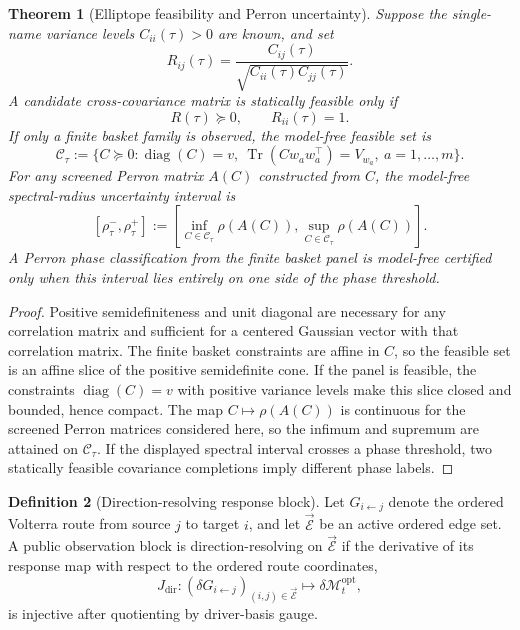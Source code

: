 \documentclass[11pt,a4paper]{amsart}
\theoremstyle{plain}
\newtheorem{theorem}{Theorem}[section]
\theoremstyle{definition}
\newtheorem{definition}[theorem]{Definition}
\theoremstyle{remark}
\newcommand{\cE}{\mathcal{E}}
\newcommand{\cM}{\mathcal{M}}
\begin{document}
\begin{theorem}[Elliptope feasibility and Perron uncertainty]\label{thm:elliptope-perron-uncertainty}
Suppose the single-name variance levels \(C_{ii}(\tau)>0\) are known, and set
\[
        R_{ij}(\tau)
        =
        \frac{C_{ij}(\tau)}{\sqrt{C_{ii}(\tau)C_{jj}(\tau)}}.
\]
A candidate cross-covariance matrix is statically feasible only if
\[
        R(\tau)\succeq0,\qquad R_{ii}(\tau)=1.
\]
If only a finite basket family is observed, the model-free feasible set is
\[
        \mathcal C_\tau
        :=
        \{C\succeq0:\operatorname{diag}(C)=v,\ 
        \operatorname{Tr}(Cw_aw_a^\top)=V_{w_a},\ a=1,\dots,m\}.
\]
For any screened Perron matrix \(A(C)\) constructed from \(C\), the model-free spectral-radius
uncertainty interval is
\[
        [\rho^-_\tau,\rho^+_\tau]
        :=
        \left[
        \inf_{C\in\mathcal C_\tau}\rho(A(C)),
        \sup_{C\in\mathcal C_\tau}\rho(A(C))
        \right].
\]
A Perron phase classification from the finite basket panel is model-free certified only when
this interval lies entirely on one side of the phase threshold.
\end{theorem}

\begin{proof}
Positive semidefiniteness and unit diagonal are necessary for any correlation matrix and
sufficient for a centered Gaussian vector with that correlation matrix.  The finite basket
constraints are affine in \(C\), so the feasible set is an affine slice of the positive
semidefinite cone.  If the panel is feasible, the constraints \(\operatorname{diag}(C)=v\) with
positive variance levels make this slice closed and bounded, hence compact.  The map
\(C\mapsto\rho(A(C))\) is continuous for the screened Perron matrices considered here, so the
infimum and supremum are attained on \(\mathcal C_\tau\).  If the displayed spectral interval
crosses a phase threshold, two statically feasible covariance completions imply different phase
labels.
\end{proof}

\begin{definition}[Direction-resolving response block]\label{def:direction-resolving-block}
Let \(G_{i\leftarrow j}\) denote the ordered Volterra route from source \(j\) to target \(i\),
and let \(\vec{\cE}\) be an active ordered edge set.  A public observation block is
direction-resolving on \(\vec{\cE}\) if the derivative of its response map with respect to the
ordered route coordinates,
\[
        J_{\mathrm{dir}}:
        (\delta G_{i\leftarrow j})_{(i,j)\in\vec{\cE}}
        \longmapsto
        \delta\cM_t^{\mathrm{opt}},
\]
is injective after quotienting by driver-basis gauge.
\end{definition}
\end{document}
